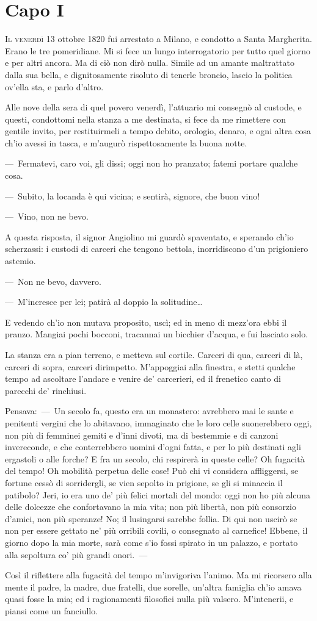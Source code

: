 
\chapter{Capo I}


\lettrine{I}{l venerdì 13} ottobre 1820 fui arrestato a Milano, e condotto a Santa
Margherita. Erano le tre pomeridiane. Mi si fece un lungo interrogatorio
per tutto quel giorno e per altri ancora. Ma di ciò non dirò nulla. Simile
ad un amante maltrattato dalla sua bella, e dignitosamente risoluto di
tenerle broncio, lascio la politica ov'ella sta, e parlo d'altro.

Alle nove della sera di quel povero venerdì, l'attuario mi consegnò al
custode, e questi, condottomi nella stanza a me destinata, si fece da me
rimettere con gentile invito, per restituirmeli a tempo debito, orologio,
denaro, e ogni altra cosa ch'io avessi in tasca, e m'augurò rispettosamente
la buona notte.

---~Fermatevi, caro voi, gli dissi; oggi non ho pranzato; fatemi portare
qualche cosa.

---~Subito, la locanda è qui vicina; e sentirà, signore, che buon vino!

---~Vino, non ne bevo.

A questa risposta, il signor Angiolino mi guardò spaventato, e sperando
ch'io scherzassi: i custodi di carceri che tengono bettola, inorridiscono
d'un prigioniero astemio.

---~Non ne bevo, davvero.

---~M'incresce per lei; patirà al doppio la solitudine\dots{}

E vedendo ch'io non mutava proposito, uscì; ed in meno di mezz'ora ebbi il
pranzo. Mangiai pochi bocconi, tracannai un bicchier d'acqua, e fui
lasciato solo.

La stanza era a pian terreno, e metteva sul cortile. Carceri di qua,
carceri di là, carceri di sopra, carceri dirimpetto. M'appoggiai alla
finestra, e stetti qualche tempo ad ascoltare l'andare e venire de'
carcerieri, ed il frenetico canto di parecchi de' rinchiusi.

Pensava:~---~Un secolo fa, questo era un monastero: avrebbero mai le sante e
penitenti vergini che lo abitavano, immaginato che le loro celle
suonerebbero oggi, non più di femminei gemiti e d'inni divoti, ma di
bestemmie e di canzoni invereconde, e che conterrebbero uomini d'ogni
fatta, e per lo più destinati agli ergastoli o alle forche? E fra un
secolo, chi respirerà in queste celle? Oh fugacità del tempo! Oh mobilità
perpetua delle cose! Può chi vi considera affliggersi, se fortune cessò di
sorridergli, se vien sepolto in prigione, se gli si minaccia il patibolo?
Jeri, io era uno de' più felici mortali del mondo: oggi non ho più alcuna
delle dolcezze che confortavano la mia vita; non più libertà, non più
consorzio d'amici, non più speranze! No; il lusingarsi sarebbe follia. Di
qui non uscirò se non per essere gettato ne' più orribili covili, o
consegnato al carnefice! Ebbene, il giorno dopo la mia morte, sarà come
s'io fossi spirato in un palazzo, e portato alla sepoltura co' più grandi
onori.~---

Così il riflettere alla fugacità del tempo m'invigoriva l'animo. Ma mi
ricorsero alla mente il padre, la madre, due fratelli, due sorelle,
un'altra famiglia ch'io amava quasi fosse la mia; ed i ragionamenti
filosofici nulla più valsero. M'intenerii, e piansi come un fanciullo.
